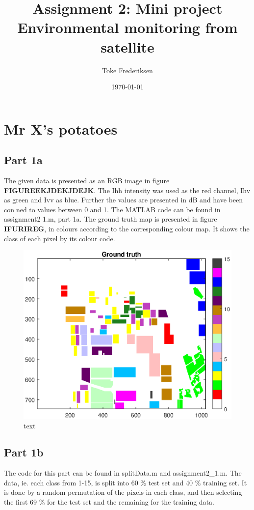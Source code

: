 \documentclass[a4paper]{article}
\title{Assignment 2: Mini project\\
	\large Environmental monitoring from satellite}
\author{Toke Frederiksen}
\date{\today}
\begin{document}
\maketitle
	
\section{Mr X's potatoes}
\subsection*{Part 1a}
The given data is presented as an RGB image in figure \textbf{FIGUREEKJDEKJDEJK}. The Ihh intensity was used as the red channel, Ihv as green and Ivv as blue. Further the values are presented in dB and have been conned to values between 0 and 1. The MATLAB code can be found in assignment2 1.m, part 1a. The ground truth map is presented in figure \textbf{IFURIREG}, in colours according to the corresponding colour map. It shows the class of each pixel by its colour code.
\begin{figure}[ht]
	\centering
		\includegraphics[width=1\textwidth
		]{gtruth}
		\caption{text}\label{key}
\end{figure}

\subsection*{Part 1b}
The code for this part can be found in splitData.m and assignment2_1.m. The data, ie. each class from 1-15, is split into 60 \% test set and 40 \% training set. It is done by a random permutation of the pixels in each class, and then selecting the first 69 \% for the test set and the remaining for the training data.
\end{document}
